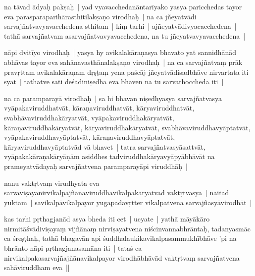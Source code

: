 \documentclass[article,12pt,a4paper]{memoir}%
\newcounter{parCount}
\begin{document}
	  
	  \pstart \leavevmode%
	\label{thakur75-23.24}na tāvad ādyaḥ pakṣaḥ | yad vyavacchedanāntarīyako yasya paricchedas tayor eva parasparaparihārasthitilakṣaṇo virodhaḥ | na ca jñeyatvādi sarvajñatvavyavacchedena sthitam | kiṃ tarhi | ajñeyatvādivyacacchedena | tathā sarvajñatvam asarvajñatvavyavacchedena, na tu jñeyatvavyavacchedena | 
	{}
	\pend%
      

	  
	  \pstart \leavevmode%
	\label{thakur75-23.28}nāpi dvitīyo virodhaḥ | yasya hy avikalakāraṇasya bhavato yat sannidhānād abhāvas tayor eva sahānavasthānalakṣaṇo virodhaḥ | na ca sarvajñatvaṃ prāk pravṛttam avikalakāraṇaṃ dṛṣṭaṃ yena paścāj jñeyatvādisadbhāve nirvartata iti syāt | tathātve sati deśādiniṣedha eva bhaven na tu sarvathoccheda iti | 
	{}
	\pend%
      

	  
	  \pstart \leavevmode%
	\label{thakur75-23.32}na ca paramparayā virodhaḥ | sa hi bhavan niṣedhyasya sarvajñatvasya vyāpakaviruddhatvāt, kāraṇaviruddhatvāt, kāryaviruddhatvāt, svabhāvaviruddhakāryatvāt, vyāpakaviruddhakāryatvāt, kāraṇaviruddhakāryatvāt, kāryaviruddhakāryatvāt, svabhāvaviruddhavyāptatvāt, vyāpakaviruddhavyāptatvāt, kāraṇaviruddhavyāptatvāt, kāryaviruddhavyāptatvād vā bhavet | tatra sarvajñatvasyāsattvāt, vyāpakakāraṇakāryāṇām asiddhes tadviruddhakāryavyāpyābhāvāt na prameyatvādayaḥ sarvajñatvena paramparayāpi viruddhāḥ | 
	{}
	\pend%
      

	  
	  \pstart \leavevmode%
	\label{thakur75-24.5}nanu vaktṛtvaṃ virudhyata eva sarvaviṣayanirvikalpajñānaviruddhavikalpakāryatvād vaktṛtvasya | naitad yuktam | savikalpāvikalpayor yugapadavṛtter vikalpatvena sarvajñasyāvirodhāt | 
	{}
	\pend%
      

	  
	  \pstart \leavevmode%
	\label{thakur75-24.8}kas tarhi pṛthagjanād asya bheda iti cet | ucyate | yathā māyākāro nirmitāśvādiviṣayaṃ vijñānaṃ nirviṣayatvena niścinvannabhrāntaḥ, tadanyasmāc ca śreṣṭhaḥ, tathā bhagavān api śuddhalaukikavikalpasammukhībhāve 'pi na bhrānto nāpi pṛthagjanasamāna iti | tataś ca nirvikalpakasarvajñajñānavikalpayor virodhābhāvād vaktṛtvaṃ sarvajñatvena sahāviruddham eva || 
	{}
	\pend%
      
\end{document}
